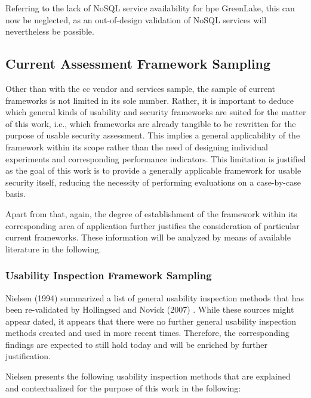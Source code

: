 Referring to the lack of NoSQL service availability for \ac{hpe} GreenLake, this can now be neglected, as an out-of-design validation of NoSQL services will nevertheless be possible.

\subsection{Current Assessment Framework Sampling}

Other than with the \ac{cc} vendor and services sample, the sample of current frameworks is not limited in its sole number. Rather, it is important to deduce which general kinds of usability and security frameworks are suited for the matter of this work, i.e., which frameworks are already tangible to be rewritten for the purpose of usable security assessment. This implies a general applicability of the framework within its scope rather than the need of designing individual experiments and corresponding performance indicators. This limitation is justified as the goal of this work is to provide a generally applicable framework for usable security itself, reducing the necessity of performing evaluations on a case-by-case basis. 

Apart from that, again, the degree of establishment of the framework within its corresponding area of application further justifies the consideration of particular current frameworks. These information will be analyzed by means of available literature in the following.

\subsubsection{Usability Inspection Framework Sampling}

Nielsen (1994) summarized a list of general usability inspection methods \cite{nielsen_usability_1994} that has been re-validated by Hollingsed and Novick (2007) \cite{hollingsed_usability_2007}. While these sources might appear dated, it appears that there were no further general usability inspection methods created and used in more recent times. Therefore, the corresponding findings are expected to still hold today and will be enriched by further justification.

Nielsen presents the following usability inspection methods that are explained and contextualized for the purpose of this work in the following:

